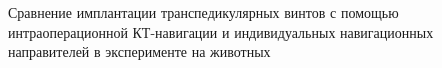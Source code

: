 
Сравнение имплантации транспедикулярных винтов с помощью
интраоперационной КТ-навигации и индивидуальных навигационных
направителей в эксперименте на животных
